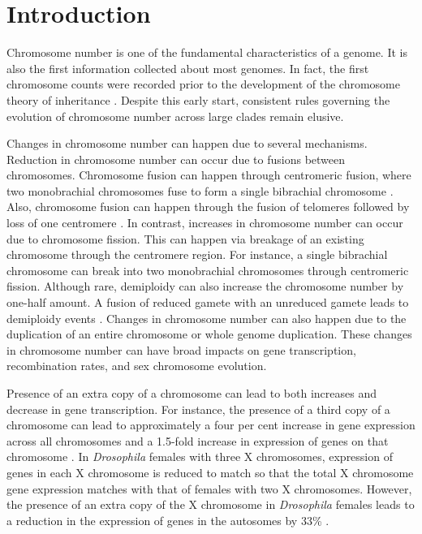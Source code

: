 \section{Introduction}

Chromosome number is one of the fundamental characteristics of a genome.
It is also the first information collected about most genomes. 
In fact, the first chromosome counts were recorded prior to the development of the chromosome theory of inheritance \citep{flemming1882}.
Despite this early start, consistent rules governing the evolution of chromosome number across large clades remain elusive. 

Changes in chromosome number can happen due to several mechanisms.
Reduction in chromosome number can occur due to fusions between chromosomes. 
Chromosome fusion can happen through centromeric fusion, where two monobrachial chromosomes fuse to form a single bibrachial chromosome \citep{o2004centromere}.
Also, chromosome fusion can happen through the fusion of telomeres followed by loss of one centromere \citep{gordon2011mechanisms}.
In contrast, increases in chromosome number can occur due to chromosome fission.
This can happen via breakage of an existing chromosome through the centromere region. 
For instance, a single bibrachial chromosome can break into two monobrachial chromosomes through centromeric fission.
Although rare, demiploidy can also increase the chromosome number by one-half amount. 
A fusion of reduced gamete with an unreduced gamete leads to demiploidy events \citep{hornsey1973}.
Changes in chromosome number can also happen due to the duplication of an entire chromosome or whole genome duplication.
These changes in chromosome number can have broad impacts on gene transcription, recombination rates, and sex chromosome evolution.

Presence of an extra copy of a chromosome can lead to both increases and decrease in gene transcription.  
For instance, the presence of a third copy of a chromosome can lead to approximately a four per cent increase in gene expression across all chromosomes and a 1.5-fold increase in expression of genes on that chromosome \citep{lockstone2007, williams2008aneuploidy}.
In \textit{Drosophila} females with three X chromosomes, expression of genes in each X chromosome is reduced to match so that the total X chromosome gene expression matches with that of females with two X chromosomes.
However, the presence of an extra copy of the X chromosome in \textit{Drosophila} females leads to a reduction in the expression of genes in the autosomes by 33\% \citep{sun2013dosage}. 

